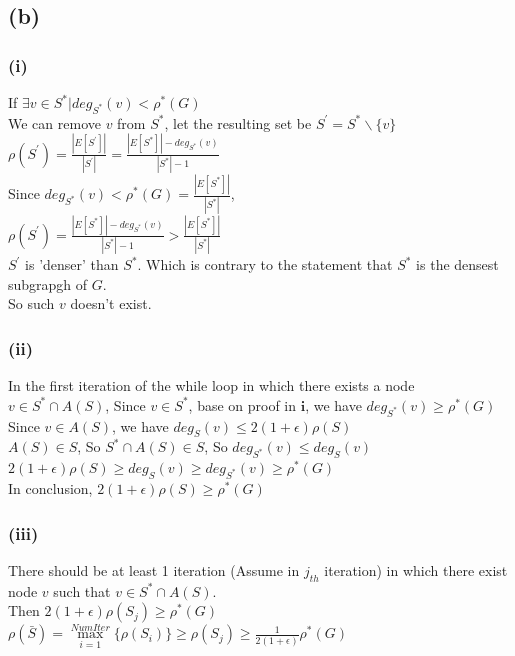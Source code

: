 \documentclass{article}
\begin{document}
 \subsection{(b)}
 \subsubsection{(i)}
 If $\exists v \in S^* | deg_{S^*}(v) < \rho^*(G)$ \\
We can remove $v$ from $S^*$, let the resulting set be $S^\prime = S^*\backslash \{v\}$ \\
$\rho(S^\prime) = \frac{|E[S^\prime]|}{|S^\prime|} = \frac{|E[S^*]| - deg_{S^*}(v)}{|S^*| - 1}$ \\
Since $deg_{S^*}(v) < \rho^*(G) = \frac{|E[S^*]|}{|S^*|}$, \\
$\rho(S^\prime) = \frac{|E[S^*]| - deg_{S^*}(v)}{|S^*| - 1} > \frac{|E[S^*]|}{|S^*|} $ \\
$S^\prime$ is 'denser' than $S^*$. Which is contrary to the statement that $S^*$ is the densest subgrapgh of $G$. \\
So such $v$ doesn't exist.

 \subsubsection{(ii)}
In the first iteration of the while loop in which there exists a node $v \in S^* \cap A(S)$, Since $v \in S^*$, base on proof in $\textbf{i}$, we have $deg_{S^*}(v) \ge \rho^*(G)$ \\
Since $v \in A(S)$, we have $deg_{S}(v) \le 2(1+\epsilon)\rho(S)$ \\
$A(S) \in S$, So $S^* \cap A(S) \in S$, So $deg_{S^*}(v) \le deg_S(v)$ \\
$2(1+\epsilon)\rho(S) \ge deg_{S}(v) \ge deg_{S^*}(v) \ge \rho^*(G)$ \\
In conclusion, $2(1+\epsilon)\rho(S) \ge \rho^*(G)$

 \subsubsection{(iii)}
There should be at least 1 iteration (Assume in $j_{th}$ iteration) in which there exist node $v$ such that $v \in S^* \cap A(S)$. \\
Then $2(1+\epsilon)\rho(S_j) \ge \rho^*(G)$ \\
$\rho(\bar S) = \max\limits_{i=1}^{Num Iter}\{ \rho(S_i)\} \ge \rho(S_j) \ge \frac{1}{2(1+\epsilon)}\rho^*(G)$
\end{document}
